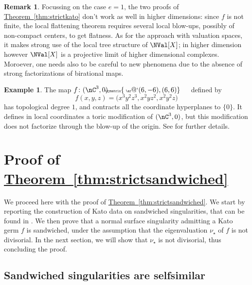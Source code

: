 \documentclass[11 pt, twoside, a4paper]{amsart}
\makeatletter
\newcommand{\Kpi}{{\pi}} %
\newcommand{\Ksigma}{{\sigma}} %
\newcommand{\selfarrow}[1][]{\tiny{\!\!\!\xymatrix{\phantom{|}\ar@`{(6,-6),(6,6)}}\hspace{4mm}}}
\theoremstyle{definition}
\newtheorem{rem}[thm]{Remark}
\newtheorem{ex}[thm]{Example}
\theoremstyle{definition}
\newcommand{\refthm}[1]{\hyperref[thm:#1]{Theorem~\ref*{thm:#1}}}
\makeatother
\begin{document}
\begin{rem}
Focussing on the case $e=1$, the two proofs of \refthm{strictkato} don't work as well in higher dimensions: since $f$ is not finite, the local flattening theorem requires several local blow-ups, possibly of non-compact centers, to get flatness.
As for the approach with valuation spaces, it makes strong use of the local tree structure of $\NVal[X]$; in higher dimension however $\NVal[X]$ is a projective limit of higher dimensional complexes.
Moroever, one needs also to be careful to new phenomena due to the absence of strong factorizations of birational maps.
\end{rem}
 
\begin{ex}
The map $f \colon (\nC^3,0) \selfarrow$ defined by
\[
f(x,y,z)=\big(x^3y^2z^3, x^2yz^2,x^2y^2z\big)
\]
has topological degree $1$, and contracts all the coordinate hyperplanes to $\{0\}$. It defines in local coordinates a toric modification of $(\nC^3,0)$, but this modification does not factorize through the blow-up of the origin.
See \cite[Example 3.6]{istrati-otiman-pontecorvo-ruggiero:torickatomanifolds} for further details.
\end{ex}

\section{Proof of \refthm{strictsandwiched}}\label{sec:Katosandwiched}

We proceed here with the proof of \refthm{strictsandwiched}. We start by reporting the construction of Kato data on sandwiched singularities, that can be found in \cite[Section 9.3]{fantini-favre-ruggiero:sandwichselfsim}.
We then prove that a normal surface singularity admitting a Kato germ $f$ is sandwiched, under the assumption that the eigenvaluation $\nu_\star$ of $f$ is not divisorial.
In the next section, we will show that $\nu_\star$ is not divisorial, thus concluding the proof.


\subsection{Sandwiched singularities are selfsimilar}\label{ssec:sandwichedselfsim}

\newcommand{\piY}{\wt{\Kpi}}
\newcommand{\sigmaY}{\wt{\Ksigma}}
\end{document}
